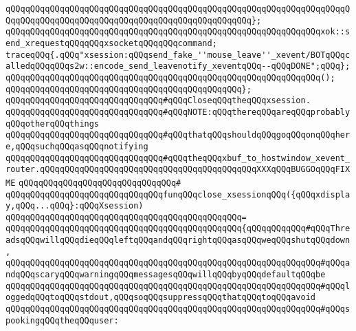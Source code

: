 \verb|qQQqqQQqqQQqqQQqqQQqqQQqqQQqqQQqqQQqqQQqqQQqqQQqqQQqqQQqqQQqqQQqqQQqqQQqqQQqqQQqqQQqqQQqqQQqqQQqqQQqqQQqqQQqqQQqqQQqqQQq};|\newline
\newline
\verb|qQQqqQQqqQQqqQQqqQQqqQQqqQQqqQQqqQQqqQQqqQQqqQQqqQQqqQQqqQQqqQQqxok::send_xrequestqQQqqQQqxsocketqQQqqQQqcommand;|\newline
\verb|traceqQQq{.qQQq"xsession:qQQqsend_fake_''mouse_leave''_xevent/BOTqQQqcalledqQQqqQQqs2w::encode_send_leavenotify_xeventqQQq--qQQqDONE";qQQq};|\newline
\verb|qQQqqQQqqQQqqQQqqQQqqQQqqQQqqQQqqQQqqQQqqQQqqQQqqQQqqQQqqQQqqQQq();|\newline
\verb|qQQqqQQqqQQqqQQqqQQqqQQqqQQqqQQqqQQqqQQqqQQqqQQq};|\newline
\newline
\newline
\verb|qQQqqQQqqQQqqQQqqQQqqQQqqQQqqQQq#qQQqCloseqQQqtheqQQqxsession.|\newline
\verb|qQQqqQQqqQQqqQQqqQQqqQQqqQQqqQQq#qQQqNOTE:qQQqthereqQQqareqQQqprobablyqQQqotherqQQqthings|\newline
\verb|qQQqqQQqqQQqqQQqqQQqqQQqqQQqqQQq#qQQqthatqQQqshouldqQQqgoqQQqonqQQqhere,qQQqsuchqQQqasqQQqnotifying|\newline
\verb|qQQqqQQqqQQqqQQqqQQqqQQqqQQqqQQq#qQQqtheqQQqxbuf_to_hostwindow_xevent_router.qQQqqQQqqQQqqQQqqQQqqQQqqQQqqQQqqQQqqQQqqQQqXXXqQQqBUGGOqQQqFIXME|\newline
\verb|qQQqqQQqqQQqqQQqqQQqqQQqqQQqqQQq#|\newline
\verb|qQQqqQQqqQQqqQQqqQQqqQQqqQQqqQQqfunqQQqclose_xsessionqQQq({qQQqxdisplay,qQQq...qQQq}:qQQqXsession)|\newline
\verb|qQQqqQQqqQQqqQQqqQQqqQQqqQQqqQQqqQQqqQQqqQQqqQQq=|\newline
\verb|qQQqqQQqqQQqqQQqqQQqqQQqqQQqqQQqqQQqqQQqqQQqqQQq{qQQqqQQqqQQq#qQQqThreadsqQQqwillqQQqdieqQQqleftqQQqandqQQqrightqQQqasqQQqweqQQqshutqQQqdown,|\newline
\verb|qQQqqQQqqQQqqQQqqQQqqQQqqQQqqQQqqQQqqQQqqQQqqQQqqQQqqQQqqQQqqQQq#qQQqandqQQqscaryqQQqwarningqQQqmessagesqQQqwillqQQqbyqQQqdefaultqQQqbe|\newline
\verb|qQQqqQQqqQQqqQQqqQQqqQQqqQQqqQQqqQQqqQQqqQQqqQQqqQQqqQQqqQQqqQQq#qQQqloggedqQQqtoqQQqstdout,qQQqsoqQQqsuppressqQQqthatqQQqtoqQQqavoid|\newline
\verb|qQQqqQQqqQQqqQQqqQQqqQQqqQQqqQQqqQQqqQQqqQQqqQQqqQQqqQQqqQQqqQQq#qQQqspookingqQQqtheqQQquser:|\newline
